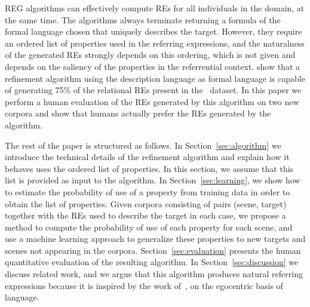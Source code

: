 REG algorithms can effectively compute REs for all individuals in the domain, at the same time. The algorithms always terminate returning a formula of the formal language chosen that uniquely describes the target. 
However, they require an ordered list of properties used in the referring expressions, and the naturalness of the generated REs strongly depends on this ordering, which is not given and depends on the saliency of the properties in the referrential context. \cite{arec:2012:coling12} show that a refinement algorithm using the description language \el as formal language is capable of generating 75\% of the relational REs present in the~\cite{viet:gene11} dataset. In this paper we perform a human evaluation of the REs generated by this algorithm on two new corpora and show that humans actually prefer the REs generated by the algorithm.  

The rest of the paper is structured as follows. In Section~\ref{sec:algorithm} we introduce the technical details of the 
refinement algorithm and explain how it behaves uses the ordered list of properties. In this section, we assume that this list is provided as 
input to the algorithm. In Section~\ref{sec:learning}, we show how to estimate the probability of use of a property from training data in order to obtain the list of properties. Given corpora consisting of pairs (scene, target) together with the REs used to 
describe the target in each case, we propose a method to compute the probability of use of each property for each scene, and use a machine learning approach to generalize these properties to new targets and scenes not appearing in the corpora. Section~\ref{sec:evaluation} presents the human quantitative evaluation of the resulting algorithm. In Section~\ref{sec:discussion} we discuss related work, and we argue that this algorithm produces natural referring expressions because it is inspired by the work of~\cite{keysar:Curr98}, on the egocentric basis of language. 

